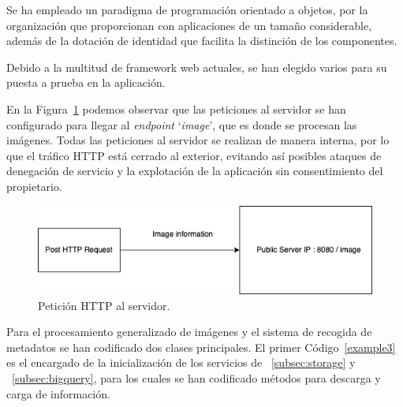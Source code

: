Se ha empleado un paradigma de programación orientado a objetos, por la organización que proporcionan con aplicaciones de un tamaño considerable, además de la dotación de identidad que facilita la distinción de los componentes.

Debido a la multitud de framework web actuales, se han elegido varios para su puesta a prueba en la aplicación.

En la Figura~\ref{fig:Petición HTTP al servidor} podemos observar que las peticiones al servidor se han configurado para llegar al \textit{endpoint} `\textit{image}', que es donde se procesan las imágenes.
Todas las peticiones al servidor se realizan de manera interna, por lo que el tráfico HTTP está cerrado al exterior, evitando así posibles ataques de denegación de servicio y la explotación de la aplicación sin consentimiento del propietario.

\begin{figure}[ht]
    \centering
    \includegraphics[width=1.0\textwidth]{images/chapter4/http_request.png}
    \caption{Petición HTTP al servidor.}
    \label{fig:Petición HTTP al servidor}
\end{figure}

Para el procesamiento generalizado de imágenes y el sistema de recogida de metadatos se han codificado dos clases principales.
El primer Código~\ref{example3} es el encargado de la inicialización de los servicios de ~\ref{subsec:storage} y ~\ref{subsec:bigquery}, para los cuales se han codificado métodos para descarga y carga de información.


